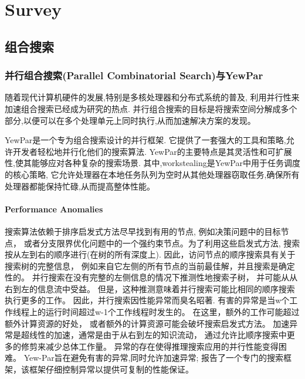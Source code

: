 \documentclass{mproj}
\begin{document}
\chapter{Survey}\label{survey}

\section{组合搜索}

\subsection{并行组合搜索(Parallel Combinatorial Search)与YewPar}
随着现代计算机硬件的发展,特别是多核处理器和分布式系统的普及,
利用并行性来加速组合搜索已经成为研究的热点.
并行组合搜索的目标是将搜索空间分解成多个部分,以便可以在多个处理单元上同时执行,从而加速解决方案的发现。

YewPar是一个专为组合搜索设计的并行框架.
它提供了一套强大的工具和策略,允许开发者轻松地并行化他们的搜索算法.
YewPar的主要特点是其灵活性和可扩展性,使其能够应对各种复杂的搜索场景.
其中,workstealing是YewPar中用于任务调度的核心策略,
它允许处理器在本地任务队列为空时从其他处理器窃取任务,确保所有处理器都能保持忙碌,从而提高整体性能。

\subsubsection{Performance Anomalies}
\label{sec:performance_anomalies}
搜索算法依赖于排序启发式方法尽早找到有用的节点,
例如决策问题中的目标节点，
或者分支限界优化问题中的一个强约束节点。为了利用这些启发式方法,
搜索按从左到右的顺序进行(在树的所有深度上).
因此，访问节点的顺序搜索具有关于搜索树的完整信息，
例如来自它左侧的所有节点的当前最佳解，并且搜索是确定性的。
并行搜索在没有完整的左侧信息的情况下推测性地搜索子树，
并可能从从右到左的信息流中受益。
但是，这种推测意味着并行搜索可能比相同的顺序搜索执行更多的工作。
因此，并行搜索因性能异常而臭名昭著\cite{10.1007/3-540-60321-2_29}.
有害的异常是当w个工作线程上的运行时间超过w-1个工作线程时发生的。
在这里，额外的工作可能超过额外计算资源的好处，
或者额外的计算资源可能会破坏搜索启发式方法。
加速异常是超线性的加速，通常是由于从右到左的知识流动，
通过允许比顺序搜索中更多的修剪来减少总体工作量。
异常的存在使得推理搜索应用的并行性能变得困难。
Yew-Par旨在避免有害的异常,同时允许加速异常;
\cite{ARCHIBALD201892}报告了一个专门的搜索框架，该框架仔细控制异常以提供可复制的性能保证。
\end{document}
